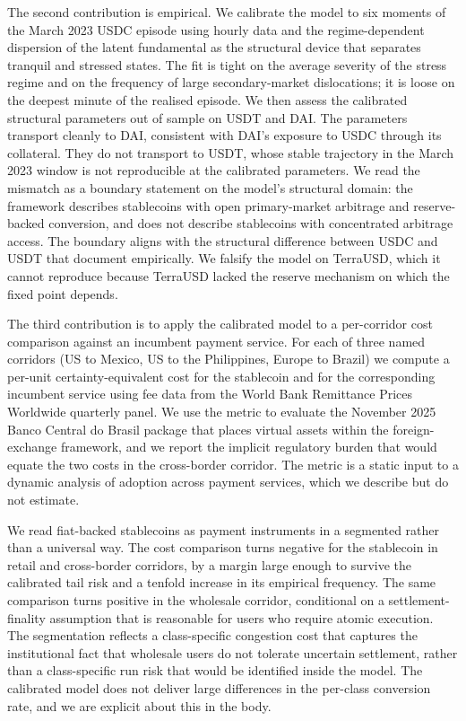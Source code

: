 The second contribution is empirical. We calibrate the model to six moments of the March 2023 USDC episode using hourly data and the regime-dependent dispersion of the latent fundamental as the structural device that separates tranquil and stressed states. The fit is tight on the average severity of the stress regime and on the frequency of large secondary-market dislocations; it is loose on the deepest minute of the realised episode. We then assess the calibrated structural parameters out of sample on USDT and DAI. The parameters transport cleanly to DAI, consistent with DAI's exposure to USDC through its collateral. They do not transport to USDT, whose stable trajectory in the March 2023 window is not reproducible at the calibrated parameters. We read the mismatch as a boundary statement on the model's structural domain: the framework describes stablecoins with open primary-market arbitrage and reserve-backed conversion, and does not describe stablecoins with concentrated arbitrage access. The boundary aligns with the structural difference between USDC and USDT that \citet{ma_zeng_zhang_2025} document empirically. We falsify the model on TerraUSD, which it cannot reproduce because TerraUSD lacked the reserve mechanism on which the fixed point depends.

The third contribution is to apply the calibrated model to a per-corridor cost comparison against an incumbent payment service. For each of three named corridors (US to Mexico, US to the Philippines, Europe to Brazil) we compute a per-unit certainty-equivalent cost for the stablecoin and for the corresponding incumbent service using fee data from the World Bank Remittance Prices Worldwide quarterly panel. We use the metric to evaluate the November 2025 Banco Central do Brasil package that places virtual assets within the foreign-exchange framework, and we report the implicit regulatory burden that would equate the two costs in the cross-border corridor. The metric is a static input to a dynamic analysis of adoption across payment services, which we describe but do not estimate.

We read fiat-backed stablecoins as payment instruments in a segmented rather than a universal way. The cost comparison turns negative for the stablecoin in retail and cross-border corridors, by a margin large enough to survive the calibrated tail risk and a tenfold increase in its empirical frequency. The same comparison turns positive in the wholesale corridor, conditional on a settlement-finality assumption that is reasonable for users who require atomic execution. The segmentation reflects a class-specific congestion cost that captures the institutional fact that wholesale users do not tolerate uncertain settlement, rather than a class-specific run risk that would be identified inside the model. The calibrated model does not deliver large differences in the per-class conversion rate, and we are explicit about this in the body.

